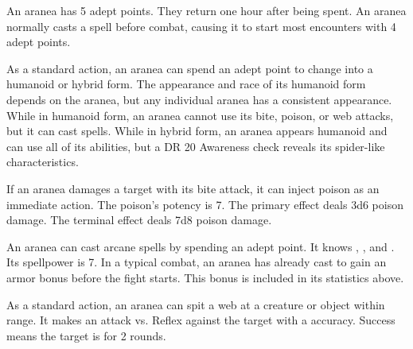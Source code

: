      An aranea has 5 adept points.
    They return one hour after being spent.
    An aranea normally casts a spell before combat, causing it to start most encounters with 4 adept points.

     As a standard action, an aranea can spend an adept point to change into a humanoid or hybrid form.
    The appearance and race of its humanoid form depends on the aranea, but any individual aranea has a consistent appearance.
    While in humanoid form, an aranea cannot use its bite, poison, or web attacks, but it can cast spells.
    While in hybrid form, an aranea appears humanoid and can use all of its abilities, but a DR 20 Awareness check reveals its spider-like characteristics.

     If an aranea damages a target with its bite attack, it can inject poison as an immediate action.
    The poison's potency is 7.
    The primary effect deals 3d6 poison damage.
    The terminal effect deals 7d8 poison damage.

     An aranea can cast arcane spells by spending an adept point.
    It knows , , and .
    Its spellpower is 7.
    In a typical combat, an aranea has already cast  to gain an armor bonus before the fight starts.
    This bonus is included in its statistics above.

     As a standard action, an aranea can spit a web at a creature or object within \rngmed range.
    It makes an attack vs. Reflex against the target with a  accuracy.
    Success means the target is \immobilized for 2 rounds.
